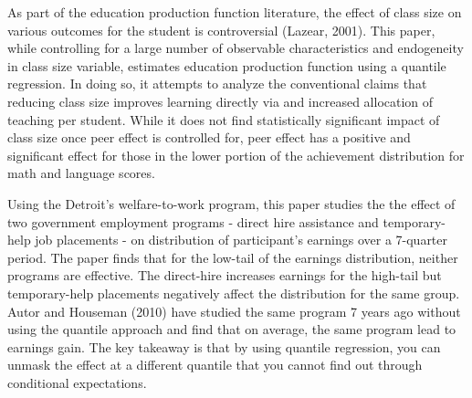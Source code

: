 \begin{mdframed}[backgroundcolor=yellow!5] 
\begin{example}[Levin, 2001]
As part of the education production function literature, the effect of class size on various outcomes for the student is controversial (Lazear, 2001). This paper, while controlling for a large number of observable characteristics and endogeneity in class size variable, estimates education production function using a quantile regression. In doing so, it attempts to analyze the conventional claims that reducing class size improves learning directly via and increased allocation of teaching per student. While it does not find statistically significant impact of class size once peer effect is controlled for, peer effect has a positive and significant effect for those in the lower portion of the achievement distribution for math and language scores. 
\end{example}

\begin{example}
Using the Detroit's welfare-to-work program, this paper studies the the effect of two government employment programs - direct hire assistance and temporary-help job placements - on distribution of participant's earnings over a 7-quarter period. The paper finds that for the low-tail of the earnings distribution, neither programs are effective. The direct-hire increases earnings for the high-tail but temporary-help placements negatively affect the distribution for the same group.  Autor and Houseman (2010) have studied the same program 7 years ago without using the quantile approach and find that on average, the same program lead to earnings gain. The key takeaway is that by using quantile regression, you can unmask the effect at a different quantile that you cannot find out through conditional expectations. 
\end{example}
\end{mdframed}

